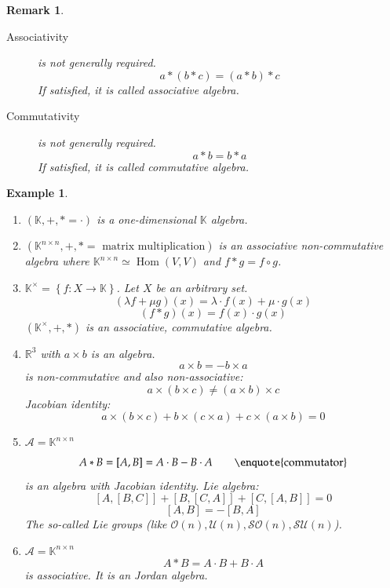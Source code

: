 \documentclass{article}
\newcounter{lecref}[section]
\numberwithin{lecref}{section}
\newtheorem{example}[lecref]{Example}
\newtheorem{remark}[lecref]{Remark}
\newcommand{\set}[1]{\left\{#1\right\}}
\DeclareMathOperator{\Hom}{Hom}
\begin{document}
\begin{remark} %
  \begin{description}
    \item[Associativity] is not generally required.
      \[ a * (b * c) = (a * b) * c \]
      If satisfied, it is called \emph{associative algebra}.
    \item[Commutativity] is not generally required.
      \[ a * b = b * a \]
      If satisfied, it is called \emph{commutative algebra}.
  \end{description}
\end{remark}

\begin{example} %
  \begin{enumerate}
    \item $(\mathbb K, +, * = \cdot)$ is a one-dimensional $\mathbb K$ algebra.
    \item $(\mathbb K^{n \times n}, +, * = \text{ matrix multiplication})$ is an associative non-commutative algebra
      where $\mathbb K^{n \times n} \simeq \Hom(V, V)$ and $f * g = f \circ g$.
    \item $\mathbb K^\times = \set{f: X \to \mathbb K}$. Let $X$ be an arbitrary set.
      \[ (\lambda f + \mu g)(x) = \lambda \cdot f(x) + \mu \cdot g(x) \]
      \[ (f * g)(x) = f(x) \cdot g(x) \]
      $(\mathbb K^\times, +, *)$ is an associative, commutative algebra.
    \item $\mathbb R^3$ with $a \times b$ is an algebra.
      \[ a \times b = -b \times a \]
      is non-commutative and also non-associative:
      \[ a \times (b \times c) \neq (a \times b) \times c \]
      Jacobian identity:
      \[ a \times (b \times c) + b \times (c \times a) + c \times (a \times b) = 0 \]
    \item $\mathcal A = \mathbb K^{n\times n}$
      \[ A * B = [A,B] = A \cdot B - B \cdot A \qquad \text{\enquote{commutator}} \]
      is an algebra with Jacobian identity. Lie algebra:
      \[ [A, [B,C]] + [B, [C,A]] + [C, [A,B]] = 0 \]
      \[ [A,B] = -[B,A] \]
      The so-called Lie groups (like $\mathcal O(n), \mathcal U(n), \mathcal{SO}(n), \mathcal{SU}(n)$).
    \item
      $\mathcal A = \mathbb K^{n\times n}$
      \[ A * B = A \cdot B + B \cdot A \]
      is associative. It is an Jordan algebra.
  \end{enumerate}
\end{example}
\end{document}
